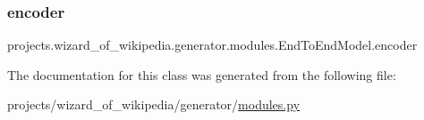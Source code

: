 \subsubsection{\texorpdfstring{encoder}{encoder}}
{\footnotesize\ttfamily projects.\+wizard\+\_\+of\+\_\+wikipedia.\+generator.\+modules.\+End\+To\+End\+Model.\+encoder}



The documentation for this class was generated from the following file\+:\begin{DoxyCompactItemize}
\item 
projects/wizard\+\_\+of\+\_\+wikipedia/generator/\hyperlink{projects_2wizard__of__wikipedia_2generator_2modules_8py}{modules.\+py}\end{DoxyCompactItemize}

